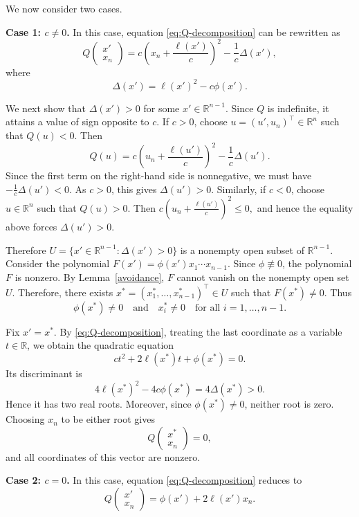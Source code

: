 \documentclass[10pt,a4paper]{amsart}
\newenvironment{pf}{\proof}{\endproof}
\begin{document}
\begin{pf}
We now consider two cases.

\medskip

\noindent\textbf{Case 1: $c\neq 0$.}
In this case, equation \eqref{eq:Q-decomposition} can be rewritten as
\[
Q\begin{pmatrix}x'\\x_n\end{pmatrix}
=
c\left(x_n+\frac{\ell(x')}{c}\right)^2
-\frac{1}{c}\Delta(x'),
\]
where
\[
\Delta(x')=\ell(x')^2-c\phi(x').
\]

We next show that $\Delta(x')>0$ for some
$x'\in\mathbb R^{n-1}$. Since $Q$ is indefinite, it
attains a value of sign opposite to $c$. If $c>0$, choose
$u=(u',u_n)^\top\in\mathbb{R}^n$ such that $Q(u)<0$. Then
\[
Q(u)=
c\left(u_n+\frac{\ell(u')}{c}\right)^2
-\frac{1}{c}\Delta(u').
\]
Since the first term on the right-hand side is nonnegative, we must have
\(
-\frac{1}{c}\Delta(u')<0.
\)
As $c>0$, this gives $\Delta(u')>0$.
Similarly, if $c<0$, choose $u\in\mathbb{R}^n$ such that $Q(u)>0$. Then
\(
c\left(u_n+\frac{\ell(u')}{c}\right)^2\le 0,
\)
and hence the equality above forces $\Delta(u')>0$.

Therefore
\(
U=\{x'\in\mathbb{R}^{n-1}:\Delta(x')>0\}
\)
is a nonempty open subset of $\mathbb{R}^{n-1}$.
Consider the polynomial
\(
F(x')=\phi(x')x_1\cdots x_{n-1}.
\)
Since $\phi\not\equiv 0$, the polynomial $F$ is nonzero. By
Lemma~\ref{avoidance}, $F$ cannot vanish on the nonempty open set $U$.
Therefore, there exists
\(
x^\ast=(x_1^\ast,\dots,x_{n-1}^\ast)^\top\in U
\)
such that
\(
F(x^\ast)\neq 0.
\)
Thus
\[
\phi(x^\ast)\neq 0
\quad\text{and}\quad
x_i^\ast\neq 0
\quad\text{for all } i=1,\dots,n-1.
\]

Fix \(x'=x^\ast\). By \eqref{eq:Q-decomposition}, treating the last coordinate as a variable
\(t\in\mathbb{R}\), we obtain the quadratic equation
\[
ct^2+2\ell(x^\ast)t+\phi(x^\ast)=0.
\]
Its discriminant is
\[
4\ell(x^\ast)^2-4c\phi(x^\ast)=4\Delta(x^\ast)>0.
\]
Hence it has two real roots. Moreover, since $\phi(x^\ast)\neq 0$, neither
root is zero. Choosing $x_n$ to be either root gives
\[
Q\begin{pmatrix}x^\ast\\x_n\end{pmatrix}=0,
\]
and all coordinates of this vector are nonzero.

\medskip

\noindent\textbf{Case 2: $c=0$.}
In this case, equation \eqref{eq:Q-decomposition} reduces to
\[
Q\begin{pmatrix}x'\\x_n\end{pmatrix}
=
\phi(x')+2\ell(x')x_n.
\]


\end{pf}
\end{document}
